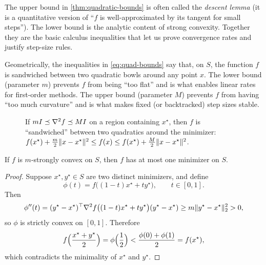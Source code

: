 The upper bound in \cref{thm:quadratic-bounds} is often called the \emph{descent lemma} (it is a quantitative version of ``$f$ is well-approximated by its tangent for small steps'').
The lower bound is the analytic content of strong convexity.
Together they are the basic calculus inequalities that let us prove convergence rates and justify step-size rules.

Geometrically, the inequalities in \eqref{eq:quad-bounds} say that, on $S$, the function $f$ is sandwiched between two quadratic bowls around any point $x$.
The lower bound (parameter $m$) prevents $f$ from being ``too flat'' and is what enables linear rates for first-order methods.
The upper bound (parameter $M$) prevents $f$ from having ``too much curvature'' and is what makes fixed (or backtracked) step sizes stable.

\begin{figure}[t]
  \centering
  
  \caption{If $mI \preceq \nabla^2 f \preceq MI$ on a region containing $x^\star$, then $f$ is ``sandwiched'' between two quadratics around the minimizer:
  $f(x^\star)+\tfrac{m}{2}\lVert x-x^\star\rVert^2 \le f(x)\le f(x^\star)+\tfrac{M}{2}\lVert x-x^\star\rVert^2$.}
  \label{fig:quadratic-sandwich}
\end{figure}

\begin{corollary}
If $f$ is $m$-strongly convex on $S$, then $f$ has at most one minimizer on $S$.
\end{corollary}
\begin{proof}
Suppose $x^\star,y^\star\in S$ are two distinct minimizers, and define
\[
\phi(t)=f\bigl((1-t)x^\star + ty^\star\bigr), \qquad t\in[0,1].
\]
Then
\[
\phi''(t)=(y^\star-x^\star)^\top \nabla^2 f\bigl((1-t)x^\star + ty^\star\bigr)(y^\star-x^\star)
\ge m\lVert y^\star-x^\star\rVert_2^2 > 0,
\]
so $\phi$ is strictly convex on $[0,1]$.
Therefore
\[
f\Bigl(\frac{x^\star+y^\star}{2}\Bigr)=\phi\Bigl(\frac12\Bigr)
< \frac{\phi(0)+\phi(1)}{2}
= f(x^\star),
\]
which contradicts the minimality of $x^\star$ and $y^\star$.
\end{proof}

